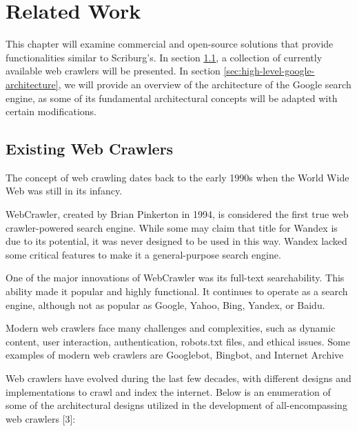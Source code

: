 \chapter{Related Work}
\label{chap:relatedwork}

This chapter will examine commercial and open-source solutions that provide functionalities similar to Scriburg's. In section \ref{sec:existing-web-crawlers}, a collection of currently available web crawlers will be presented. In section \ref{sec:high-level-google-architecture}, we will provide an overview of the architecture of the Google search engine, as some of its fundamental architectural concepts will be adapted with certain modifications.

\section{Existing Web Crawlers}\label{sec:existing-web-crawlers}
The concept of web crawling dates back to the early 1990s when the World Wide Web was still in its infancy.

WebCrawler, created by Brian Pinkerton in 1994, is considered the first true web crawler-powered search engine. While some may claim that title for Wandex is due to its potential, it was never designed to be used in this way. Wandex lacked some critical features to make it a general-purpose search engine.

One of the major innovations of WebCrawler was its full-text searchability. This ability made it popular and highly functional. It continues to operate as a search engine, although not as popular as Google, Yahoo, Bing, Yandex, or Baidu.

Modern web crawlers face many challenges and complexities, such as dynamic content, user interaction, authentication, robots.txt files, and ethical issues. Some examples of modern web crawlers are Googlebot, Bingbot, and Internet Archive

Web crawlers have evolved during the last few decades, with different designs and implementations to crawl and index the internet. Below is an enumeration of some of the architectural designs utilized in the development of all-encompassing web crawlers [3]:


